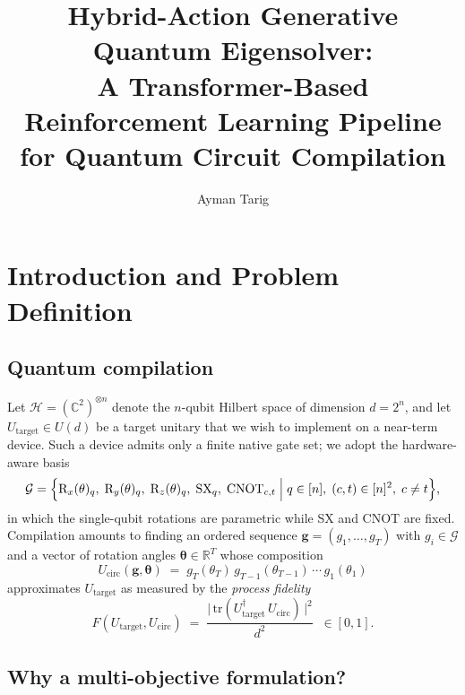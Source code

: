 \documentclass[11pt,a4paper]{article}
\title{\textbf{Hybrid-Action Generative Quantum Eigensolver:\\
A Transformer-Based Reinforcement Learning Pipeline\\
for Quantum Circuit Compilation}}
\author{Ayman Tarig}
\newcommand{\Utarget}{U_{\text{target}}}
\newcommand{\Ucirc}{U_{\text{circ}}}
\newcommand{\Real}{\mathbb{R}}
\newcommand{\Complex}{\mathbb{C}}
\begin{document}
\maketitle

\section{Introduction and Problem Definition}

\subsection{Quantum compilation}

Let $\mathcal{H} = (\Complex^2)^{\otimes n}$ denote the $n$-qubit Hilbert space of dimension $d = 2^n$, and let $\Utarget \in U(d)$ be a target unitary that we wish to implement on a near-term device. Such a device admits only a finite native gate set; we adopt the hardware-aware basis
\begin{equation}
\mathcal{G}
=
\Bigl\{
\mathrm{R}_x(\theta)_q,\;
\mathrm{R}_y(\theta)_q,\;
\mathrm{R}_z(\theta)_q,\;
\mathrm{SX}_q,\;
\mathrm{CNOT}_{c,t}
\;\Big|\;
q \in [n],\; (c,t) \in [n]^2,\; c \neq t
\Bigr\},
\end{equation}
in which the single-qubit rotations are parametric while SX and CNOT are fixed. Compilation amounts to finding an ordered sequence $\bm{g} = (g_1, \dots, g_T)$ with $g_i \in \mathcal{G}$ and a vector of rotation angles $\bm{\theta} \in \Real^T$ whose composition
\begin{equation}
\Ucirc(\bm{g}, \bm{\theta})
\;=\;
g_T(\theta_T)\, g_{T-1}(\theta_{T-1})\, \cdots\, g_1(\theta_1)
\end{equation}
approximates $\Utarget$ as measured by the \emph{process fidelity}
\begin{equation}
\boxed{\;\;
F(\Utarget, \Ucirc)
\;=\;
\frac{\bigl|\,\mathrm{tr}(\Utarget^{\dagger}\,\Ucirc)\,\bigr|^{2}}{d^{2}}
\;\;\in [0,1].
\;\;}
\label{eq:process-fidelity}
\end{equation}

\subsection{Why a multi-objective formulation?}
\end{document}
